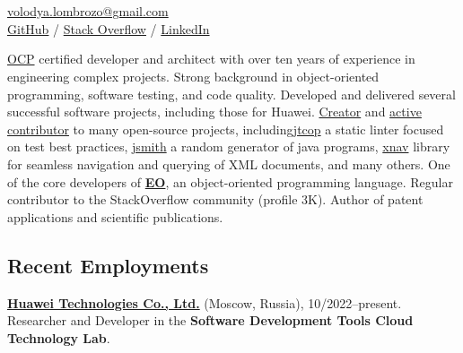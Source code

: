 \documentclass{vl}
\begin{document}
    \vlPrintPhoto{}

    \section*{\Large {}}

    \href{mailto:volodya.lombrozo@gmail.com}{volodya.lombrozo@gmail.com}\\%
    \href{https://github.com/volodya-lombrozo}{GitHub} /
    \href{https://stackoverflow.com/users/10423604/volodya-lombrozo}{Stack Overflow} /
    \href{https://www.linkedin.com/in/vladimir-zakharov-lombrozo-b71744216/}{LinkedIn}

    \vspace*{12pt}

    \href{https://catalog-education.oracle.com/pls/certview/sharebadge?id=87F6A2FE819A5A5AF4120A05900AB28A461EE9A3EE9FBFA02721FADAEB3BCE19}{OCP}
    certified developer and architect with over ten years of experience in engineering complex projects.
    Strong background in object-oriented programming, software testing, and code quality.
    Developed and delivered several successful software projects, including those for Huawei.
    \href{https://github.com/volodya-lombrozo?tab=repositories}{Creator} and
    \href{https://github.com/volodya-lombrozo}{active contributor} to many open-source projects,
    including\href{https://github.com/volodya-lombrozo/jtcop}{jtcop} a static linter focused on test best practices,
    \href{https://github.com/volodya-lombrozo/jsmith}{jsmith} a random generator of java programs,
    \href{https://github.com/volodya-lombrozo/xnav}{xnav} library for seamless navigation and querying of XML documents,
    and many others.
    One of the core developers of \textbf{\href{https://www.eolang.org}{EO}}, an object-oriented programming language.
    Regular contributor to the StackOverflow community (profile 3K).
    Author of patent applications and scientific publications.

    \subsection*{Recent Employments}

    \textbf{\href{https://www.huawei.com}{Huawei Technologies Co., Ltd.}} (Moscow, Russia), 10/2022--present.
    Researcher and Developer in the \textbf{Software Development Tools Cloud Technology Lab}.
\end{document}
